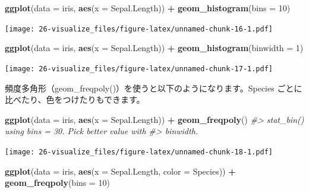 \documentclass[
  xelatex, ja=standard]{bxjsbook}
\newenvironment{Shaded}{\begin{snugshade}}{\end{snugshade}}
\newcommand{\AttributeTok}[1]{\textcolor[rgb]{0.13,0.29,0.53}{#1}}
\newcommand{\CommentTok}[1]{\textcolor[rgb]{0.56,0.35,0.01}{\textit{#1}}}
\newcommand{\DecValTok}[1]{\textcolor[rgb]{0.00,0.00,0.81}{#1}}
\newcommand{\FunctionTok}[1]{\textcolor[rgb]{0.13,0.29,0.53}{\textbf{#1}}}
\newcommand{\NormalTok}[1]{#1}
\newcommand{\SpecialCharTok}[1]{\textcolor[rgb]{0.81,0.36,0.00}{\textbf{#1}}}
\theoremstyle{definition}
\theoremstyle{definition}
\theoremstyle{definition}
\theoremstyle{definition}
\theoremstyle{remark}
\begin{document}
\begin{Shaded}
\begin{Highlighting}[]
\FunctionTok{ggplot}\NormalTok{(}\AttributeTok{data =}\NormalTok{ iris, }\FunctionTok{aes}\NormalTok{(}\AttributeTok{x =}\NormalTok{ Sepal.Length)) }\SpecialCharTok{+}
  \FunctionTok{geom\_histogram}\NormalTok{(}\AttributeTok{bins =} \DecValTok{10}\NormalTok{)}
\end{Highlighting}
\end{Shaded}

\texttt{[image: 26-visualize\_files/figure-latex/unnamed-chunk-16-1.pdf]}

\begin{Shaded}
\begin{Highlighting}[]
\FunctionTok{ggplot}\NormalTok{(}\AttributeTok{data =}\NormalTok{ iris, }\FunctionTok{aes}\NormalTok{(}\AttributeTok{x =}\NormalTok{ Sepal.Length)) }\SpecialCharTok{+}
  \FunctionTok{geom\_histogram}\NormalTok{(}\AttributeTok{binwidth =} \DecValTok{1}\NormalTok{)}
\end{Highlighting}
\end{Shaded}

\texttt{[image: 26-visualize\_files/figure-latex/unnamed-chunk-17-1.pdf]}

頻度多角形（geom\_freqpoly()）を使うと以下のようになります。Species ごとに比べたり、色をつけたりもできます。

\begin{Shaded}
\begin{Highlighting}[]
\FunctionTok{ggplot}\NormalTok{(}\AttributeTok{data =}\NormalTok{ iris, }\FunctionTok{aes}\NormalTok{(}\AttributeTok{x =}\NormalTok{ Sepal.Length)) }\SpecialCharTok{+}
  \FunctionTok{geom\_freqpoly}\NormalTok{()}
\CommentTok{\#\textgreater{} \textasciigrave{}stat\_bin()\textasciigrave{} using \textasciigrave{}bins = 30\textasciigrave{}. Pick better value with}
\CommentTok{\#\textgreater{} \textasciigrave{}binwidth\textasciigrave{}.}
\end{Highlighting}
\end{Shaded}

\texttt{[image: 26-visualize\_files/figure-latex/unnamed-chunk-18-1.pdf]}

\begin{Shaded}
\begin{Highlighting}[]
\FunctionTok{ggplot}\NormalTok{(}\AttributeTok{data =}\NormalTok{ iris, }\FunctionTok{aes}\NormalTok{(}\AttributeTok{x =}\NormalTok{ Sepal.Length, }\AttributeTok{color =}\NormalTok{ Species)) }\SpecialCharTok{+}
  \FunctionTok{geom\_freqpoly}\NormalTok{(}\AttributeTok{bins =} \DecValTok{10}\NormalTok{)}
\end{Highlighting}
\end{Shaded}
\end{document}
